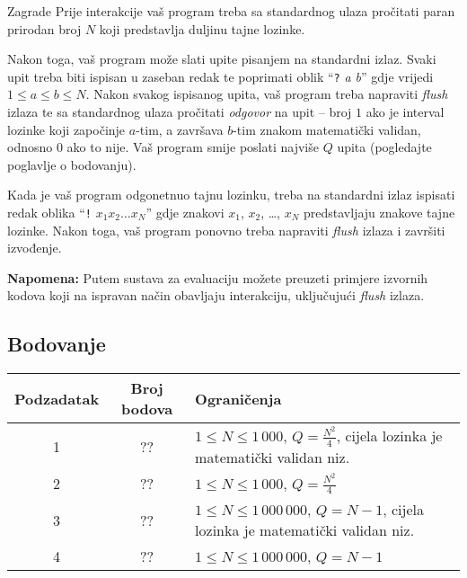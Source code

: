 \begin{statement}[
  problempoints=100,
  timelimit=1 sekunda,
  memorylimit=512 MiB,
]{Zagrade}
Prije interakcije vaš program treba sa standardnog ulaza pročitati paran
prirodan broj $N$ koji predstavlja duljinu tajne lozinke.

Nakon toga, vaš program može slati upite pisanjem na standardni izlaz. Svaki
upit treba biti ispisan u zaseban redak te poprimati oblik
``\texttt{?} \textit{a b}''
gdje vrijedi $1 \le a \le b \le N$. Nakon svakog ispisanog upita, vaš program
treba napraviti \textit{flush} izlaza te sa standardnog ulaza pročitati
\textit{odgovor} na upit -- broj $1$ ako je interval lozinke koji započinje
$a$-tim, a završava $b$-tim znakom matematički validan, odnosno $0$ ako to
nije. Vaš program smije poslati najviše $Q$ upita (pogledajte poglavlje o
bodovanju).

Kada je vaš program odgonetnuo tajnu lozinku, treba na standardni izlaz
ispisati redak oblika ``\texttt{!} \textit{$x_1x_2\dots x_N$}'' gdje znakovi
$x_1$, $x_2$, \dots, $x_N$ predstavljaju znakove tajne lozinke. Nakon toga, vaš
program ponovno treba napraviti \textit{flush} izlaza i završiti izvođenje.

\textbf{Napomena:} Putem sustava za evaluaciju možete preuzeti primjere
izvornih kodova koji na ispravan način obavljaju interakciju, uključujući
\textit{flush} izlaza.

\subsection*{Bodovanje}
{\renewcommand{\arraystretch}{1.4}
  \setlength{\tabcolsep}{6pt}
  \begin{tabular}{ccl}
    Podzadatak & Broj bodova & Ograničenja \\ \midrule
    1 & ?? & $1 \le N \le 1\,000$, $Q = \frac{N^2}{4}$, cijela lozinka je matematički validan niz. \\
    2 & ?? & $1 \le N \le 1\,000$, $Q = \frac{N^2}{4}$ \\
    3 & ?? & $1 \le N \le 1\,000\,000 $, $Q = N - 1$, cijela lozinka je matematički validan niz. \\
    4 & ?? & $1 \le N \le 1\,000\,000 $, $Q = N - 1$ \\
\end{tabular}}


\end{statement}
